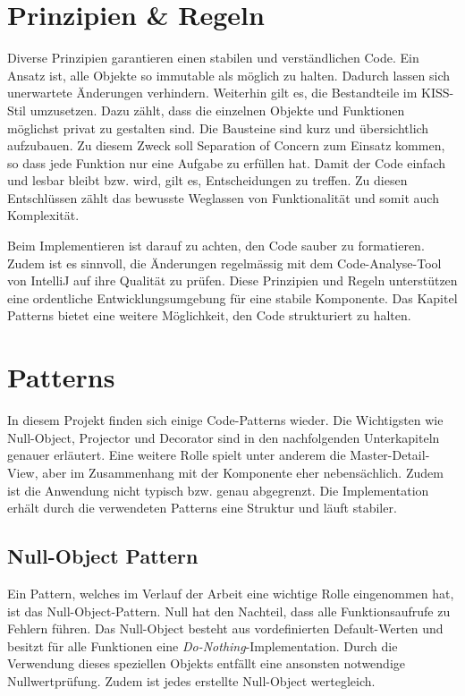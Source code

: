 \section{Prinzipien \& Regeln}
\label{sec:principleRules}

Diverse Prinzipien garantieren einen stabilen und verständlichen Code. 
Ein Ansatz ist, alle Objekte so immutable als möglich zu halten. 
Dadurch lassen sich unerwartete Änderungen verhindern. 
Weiterhin gilt es, die Bestandteile im KISS-Stil umzusetzen. 
Dazu zählt, dass die einzelnen Objekte und Funktionen möglichst privat zu gestalten sind. 
Die Bausteine sind kurz und übersichtlich aufzubauen. 
Zu diesem Zweck soll Separation of Concern zum Einsatz kommen, so dass jede Funktion nur eine Aufgabe zu erfüllen hat. 
Damit der Code einfach und lesbar bleibt bzw. wird, gilt es, Entscheidungen zu treffen. 
Zu diesen Entschlüssen zählt das bewusste Weglassen von Funktionalität und somit auch Komplexität. 

Beim Implementieren ist darauf zu achten, den Code sauber zu formatieren. 
Zudem ist es sinnvoll, die Änderungen regelmässig mit dem Code-Analyse-Tool von IntelliJ auf ihre Qualität zu prüfen. 
Diese Prinzipien und Regeln unterstützen eine ordentliche Entwicklungsumgebung für eine stabile Komponente. 
Das Kapitel Patterns bietet eine weitere Möglichkeit, den Code strukturiert zu halten. 


\section{Patterns}
\label{sec:patterns}

In diesem Projekt finden sich einige Code-Patterns wieder. 
Die Wichtigsten wie Null-Object, Projector und Decorator sind in den nachfolgenden Unterkapiteln genauer erläutert.
Eine weitere Rolle spielt unter anderem die Master-Detail-View, aber im Zusammenhang mit der Komponente eher nebensächlich. 
Zudem ist die Anwendung nicht typisch bzw. genau abgegrenzt. 
Die Implementation erhält durch die verwendeten Patterns eine Struktur und läuft stabiler. 


\subsection{Null-Object Pattern}
\label{sec:nullPattern}

Ein Pattern, welches im Verlauf der Arbeit eine wichtige Rolle eingenommen hat, ist das Null-Object-Pattern. 
Null hat den Nachteil, dass alle Funktionsaufrufe zu Fehlern führen. 
Das Null-Object besteht aus vordefinierten Default-Werten und besitzt für alle Funktionen eine \emph{Do-Nothing}-Implementation. 
Durch die Verwendung dieses speziellen Objekts entfällt eine ansonsten notwendige Nullwertprüfung. 
Zudem ist jedes erstellte Null-Object wertegleich. 

